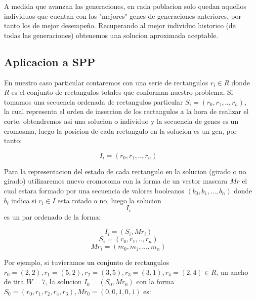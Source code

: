 \documentclass[10pt]{article}
\begin{document}
A medida que avanzan las generaciones, en cada poblacion solo quedan aquellos individuos que cuentan con los "mejores" genes de generaciones anteriores, por tanto los de mejor desempeño. Recuperando al mejor individuo historico (de todas las generaciones) obtenemos una solucion aproximada aceptable.

\subsection{Aplicacion a SPP}
En nuestro caso particular contaremos con una serie de rectangulos $r_i \in R$ donde $R$ es el conjunto de rectangulos totales que conforman nuestro problema. Si tomamos una secuencia ordenada de rectangulos particular $S_i = (r_0,r_1,..,r_n)$, la cual representa el orden de insercion de los rectangulos a la hora de realizar el corte, obtendremos asi una solucion o individuo y la secuencia de genes es un cromosma, luego la posicion de cada rectangulo en la solucion es un gen, por tanto:

$$I_i = (r_0,r_1,..,r_n)$$

Para la representacion del estado de cada rectangulo en la solucion (girado o no girado) utilizaremos nuevo cromosoma con la forma de un vector mascara $Mr$ el cual estara formado por una secuencia de valores booleanos $(b_0, b_1,...,b_n)$ donde $b_i$ indica si $r_i \in I$ esta rotado o no, luego la solucion $$I_i$$ es un par ordenado de la forma:

$$I_i = (S_i,Mr_i)$$
$$S_i = (r_0,r_1,..,r_n)$$
$$Mr_i = (m_0, m_1,...,m_n)$$


Por ejemplo, si tuvieramos un conjunto de rectangulos $r_0=(2,2),r_1=(5,2),r_2=(3,5), r_3 = (3,1), r_4=(2,4)\in R$, un ancho de tira $W = 7$, la solucion $I_0 = (S_0,Mr_0)$ con la forma $S_0 = (r_0,r_1,r_2,r_4,r_3), Mr_0 = (0,0,1,0,1)$ es:
\end{document}
